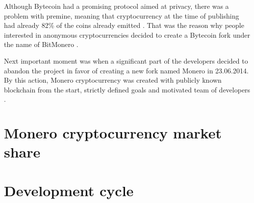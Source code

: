 \documentclass[
  printed, %
  table,   %
  nolof,     %
  nolot,     %
           oneside, color
]{fithesis3}
\begin{document}
Although Bytecoin had a promising protocol aimed at privacy, there was a problem with premine, meaning that cryptocurrency at the time of publishing had already 82\% of the coins already emitted \cite{fluffyponyonbytecoin}.
That was the reason why people interested in anonymous cryptocurrencies decided to create a Bytecoin fork under the name of BitMonero \cite{bitmonero}. 



Next important moment was when a significant part of the developers decided to abandon the project in favor of creating a new fork named Monero in 23.06.2014. By this action, Monero cryptocurrency was created with publicly known blockchain from the start, strictly defined goals and motivated team of developers \cite{monerofork}.


\section{Monero cryptocurrency market share}
\newpage
\section{Development cycle}
\end{document}

